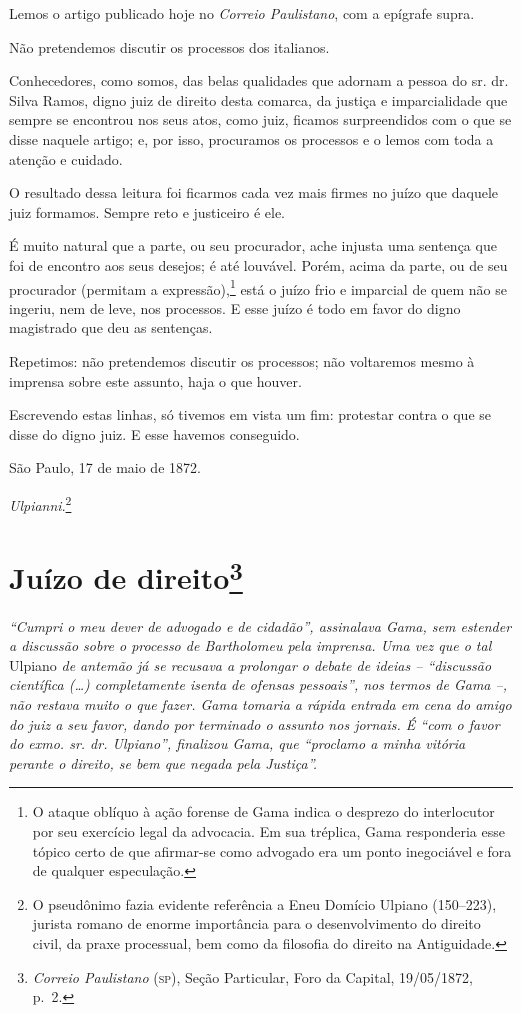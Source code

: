 Lemos o artigo publicado hoje no \emph{Correio Paulistano}, com a
epígrafe supra.

Não pretendemos discutir os processos dos italianos.

Conhecedores, como somos, das belas qualidades que adornam a pessoa do
sr. dr. Silva Ramos, digno juiz de direito desta comarca, da justiça e
imparcialidade que sempre se encontrou nos seus atos, como juiz, ficamos
surpreendidos com o que se disse naquele artigo; e, por isso, procuramos
os processos e o lemos com toda a atenção e cuidado.

O resultado dessa leitura foi ficarmos cada vez mais firmes no juízo que
daquele juiz formamos. Sempre reto e justiceiro é ele.

É muito natural que a parte, ou seu procurador, ache injusta uma
sentença que foi de encontro aos seus desejos; é até louvável. Porém,
acima da parte, ou de seu procurador (permitam a expressão),\footnote{
  O ataque oblíquo à ação forense de Gama indica o desprezo do
  interlocutor por seu exercício legal da advocacia. Em sua tréplica,
  Gama responderia esse tópico certo de que afirmar-se como advogado era
  um ponto inegociável e fora de qualquer especulação.} está o juízo
frio e imparcial de quem não se ingeriu, nem de leve, nos processos. E
esse juízo é todo em favor do digno magistrado que deu as sentenças.

Repetimos: não pretendemos discutir os processos; não voltaremos mesmo à
imprensa sobre este assunto, haja o que houver.

Escrevendo estas linhas, só tivemos em vista um fim: protestar contra o
que se disse do digno juiz. E esse havemos conseguido.

São Paulo, 17 de maio de 1872.

\emph{Ulpianni}.\footnote{ O pseudônimo fazia evidente referência a
  Eneu Domício Ulpiano (150--223), jurista romano de enorme importância
  para o desenvolvimento do direito civil, da praxe processual, bem como
  da filosofia do direito na Antiguidade.}

\chapter{Juízo de direito\footnote{\emph{Correio Paulistano} (\textsc{sp}), Seção Particular, Foro
  da Capital, 19/05/1872, p.~2.}} %

\begin{didascalia}
\emph{``Cumpri o meu dever de advogado e de cidadão'', assinalava Gama,
sem estender a discussão sobre o processo de Bartholomeu pela imprensa.
Uma vez que o tal} Ulpiano \emph{de antemão já se recusava a prolongar o
debate de ideias -- ``discussão científica (\ldots{}) completamente isenta de
ofensas pessoais'', nos termos de Gama --, não restava muito o que fazer.
Gama tomaria a rápida entrada em cena do amigo do juiz a seu favor,
dando por terminado o assunto nos jornais. É ``com o favor do exmo. sr.
dr. Ulpiano'', finalizou Gama, que ``proclamo a minha vitória perante o
direito, se bem que negada pela Justiça''.}
\end{didascalia}


